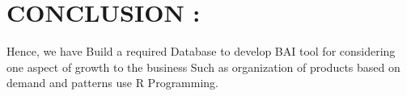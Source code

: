 \documentclass[10pt,a4paper]{article}
\begin{document}
\begin{center}
	\begin{figure}[!htbp]
		\centering
		\label{fig:usecase}
	\end{figure}
\end{center}  
			
\newpage
\section{CONCLUSION : }
Hence, we have  Build a required Database to develop BAI tool for considering one aspect of growth to the business Such as organization of products based on demand and patterns use R Programming.
\end{document}
